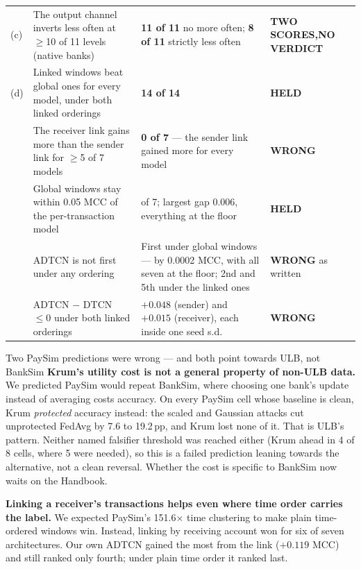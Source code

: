 \documentclass[11pt]{article}
\newcommand{\x}{\ensuremath{\times}}
\newcommand{\atleast}{\ensuremath{\ge}}
\newcommand{\HELD}{\textcolor{okgreen}{\textbf{\small HELD}}}
\newcommand{\WRONG}{\textcolor{badred}{\textbf{\small WRONG}}}
\begin{document}
\begin{center}
\begin{tabularx}{\linewidth}{@{}p{0.75cm} >{\raggedright\arraybackslash}p{4.5cm} >{\raggedright\arraybackslash}X >{\raggedright\arraybackslash}p{2.35cm}@{}}
(c) & The output channel inverts less often at \atleast10 of 11 levels (native banks) & \textbf{11 of 11} no more often; \textbf{8 of 11} strictly less often & \textcolor{steel}{\textbf{\small TWO SCORES,\newline NO VERDICT}} \\
(d) & Linked windows beat global ones for every model, under both linked orderings & \textbf{14 of 14} & \HELD \\
    & The receiver link gains more than the sender link for \atleast5 of 7 models & \textbf{0 of 7} --- the sender link gained more for every model & \WRONG \\
    & Global windows stay within 0.05 MCC of the per-transaction model & 7 of 7; largest gap 0.006, everything at the floor & \HELD \\
    & ADTCN is not first under any ordering & First under global windows --- by 0.0002 MCC, with all seven at the floor; 2nd and 5th under the linked ones & \WRONG{} as written \\
    & ADTCN $-$ DTCN $\le 0$ under both linked orderings & $+0.048$ (sender) and $+0.015$ (receiver), each inside one seed s.d. & \WRONG \\
\bottomrule
\end{tabularx}
\end{center}

\begin{warnbox}{Two PaySim predictions were wrong --- and both point towards ULB, not BankSim}
\textbf{Krum's utility cost is not a general property of non-ULB data.} We predicted PaySim would repeat
BankSim, where choosing one bank's update instead of averaging costs accuracy. On every PaySim cell whose
baseline is clean, Krum \emph{protected} accuracy instead: the scaled and Gaussian attacks cut unprotected
FedAvg by 7.6 to 19.2\,pp, and Krum lost none of it. That is ULB's pattern. Neither named falsifier
threshold was reached either (Krum ahead in 4 of 8 cells, where 5 were needed), so this is a failed
prediction leaning towards the alternative, not a clean reversal. Whether the cost is specific to BankSim
now waits on the Handbook.

\textbf{Linking a receiver's transactions helps even where time order carries the label.} We expected
PaySim's 151.6\x{} time clustering to make plain time-ordered windows win. Instead, linking by receiving
account won for six of seven architectures. Our own ADTCN gained the most from the link ($+0.119$ MCC) and
still ranked only fourth; under plain time order it ranked last.
\end{warnbox}
\end{document}
